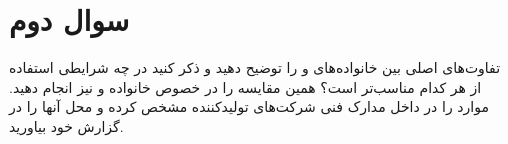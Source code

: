 \section{سوال دوم}
تفاوت‌های اصلی بین خانواده‌های  و  را توضیح دهید و ذکر کنید در چه شرایطی استفاده از هر کدام مناسب‌تر است؟ همین مقایسه را در خصوص خانواده  و  نیز انجام دهید. موارد را در داخل مدارک فنی شرکت‌های تولیدکننده مشخص کرده و محل آنها را در گزارش خود بیاورید.





\begin{qsolve}
	
	
\end{qsolve}

 


%		
